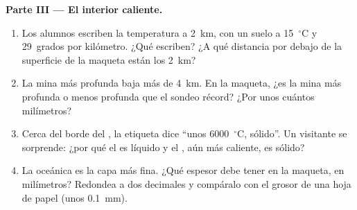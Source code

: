 \begin{problem}
\medskip
\noindent\textbf{Parte III --- El interior caliente.}
\begin{enumerate}[resume]
  \item Los alumnos escriben la temperatura a 2~km, con un suelo a
        15~$^\circ$C y 29~grados por kilómetro. ¿Qué escriben? ¿A qué
        distancia por debajo de la superficie de la maqueta están los
        2~km?
  \item La mina más profunda baja más de 4~km. En la maqueta, ¿es la mina
        más profunda o menos profunda que el sondeo récord? ¿Por unos
        cuántos milímetros?
  \item Cerca del borde del , la etiqueta dice ``unos
        6000~$^\circ$C, sólido''. Un visitante se sorprende: ¿por qué el
         es líquido y el , aún más caliente, es
        sólido?
  \item La  oceánica es la capa más fina. ¿Qué espesor debe tener en
        la maqueta, en milímetros? Redondea a dos decimales y compáralo con
        el grosor de una hoja de papel (unos 0.1~mm).
\end{enumerate}
\end{problem}
